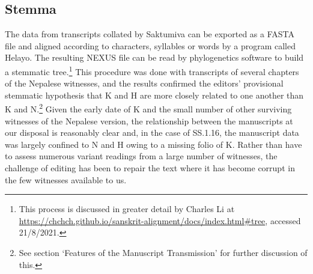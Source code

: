 %    
%    
%    

\subsection{Stemma}
The data from transcripts collated by Saktumiva can be exported as a FASTA file 
and aligned according to characters, syllables or words by a program called 
Helayo. The resulting NEXUS file can be read by phylogenetics software to build a 
stemmatic tree.\footnote{This process is discussed in greater detail by Charles Li 
at \url{https://chchch.github.io/sanskrit-alignment/docs/index.html\#tree}, 
accessed 21/8/2021.} This procedure was done with transcripts of several 
chapters of the Nepalese witnesses, and the results confirmed the editors' 
provisional stemmatic hypothesis that 
K and H are more closely related to one another than K and N.\footnote{See 
section `Features of the Manuscript Transmission' for further discussion of this.} 
Given the early date of K and the small number of other surviving witnesses of the 
Nepalese version, the relationship between the manuscripts at our disposal is 
reasonably clear and, in the case of SS.1.16, the manuscript data was largely 
confined to N and H owing to a missing folio of K. Rather than have to assess 
numerous variant readings from a large number of witnesses, the challenge of 
editing has 
been to repair the text where it has become corrupt in the few witnesses available 
to us. 

